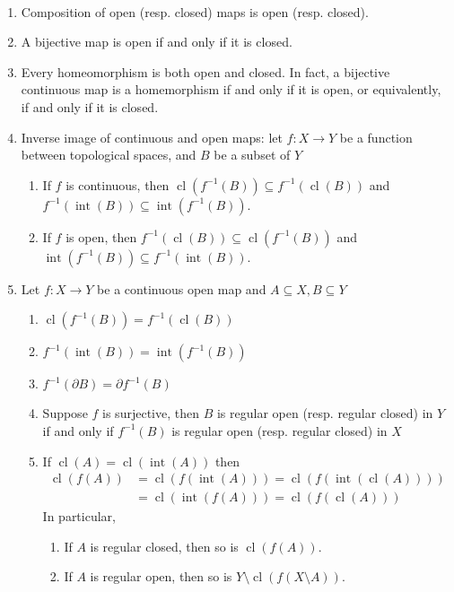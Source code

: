 \documentclass{treatise}
\begin{document}
\begin{proposition} \label{topo-open-closed-map-prop}\ 
\begin{enumerate}
    \item Composition of open (resp. closed) maps is open (resp. closed).
    \item A bijective map is open if and only if it is closed.
    \item Every homeomorphism is both open and closed. In fact, a bijective continuous map is a homemorphism if and only if it is open, or equivalently, if and only if it is closed.
    \item Inverse image of continuous and open maps: let $f: X \to Y$ be a function between topological spaces, and $B$ be a subset of $Y$
    \begin{enumerate}
        \item If $f$ is continuous, then $\operatorname{cl}(f^{-1}(B)) \subseteq f^{-1}(\operatorname{cl}(B))$ and $f^{-1}(\operatorname{int}(B)) \subseteq \operatorname{int}(f^{-1}(B))$.
        \item If $f$ is open, then $f^{-1}(\operatorname{cl}(B)) \subseteq \operatorname{cl}(f^{-1}(B))$ and $\operatorname{int}(f^{-1}(B)) \subseteq f^{-1}(\operatorname{int}(B))$.
    \end{enumerate}
    \item Let $f: X \to Y$ be a continuous open map and $A \subseteq X, B \subseteq Y$
    \begin{enumerate}
        \item $\operatorname{cl}(f^{-1}(B)) = f^{-1}(\operatorname{cl}(B))$
        \item $f^{-1}(\operatorname{int}(B)) = \operatorname{int}(f^{-1}(B))$
        \item $f^{-1}(\partial B) = \partial f^{-1}(B)$
        \item Suppose $f$ is surjective, then $B$ is regular open (resp. regular closed) in $Y$ if and only if $f^{-1}(B)$ is regular open (resp. regular closed) in $X$
        \item If $\operatorname{cl}(A) = \operatorname{cl}(\operatorname{int}(A))$ then
        \begin{align*}
            \operatorname{cl}(f(A)) & = \operatorname{cl}(f(\operatorname{int}(A))) = \operatorname{cl}(f(\operatorname{int}(\operatorname{cl}(A))))
            \\
            & = \operatorname{cl}(\operatorname{int}(f(A))) = \operatorname{cl}(f(\operatorname{cl}(A)))
        \end{align*}
        In particular,
        \begin{enumerate}
            \item If $A$ is regular closed, then so is $\operatorname{cl}(f(A))$.
            \item If $A$ is regular open, then so is $Y \setminus \operatorname{cl}(f(X \setminus A))$.
        \end{enumerate}
    \end{enumerate}
\end{enumerate}
\end{proposition}
\end{document}
